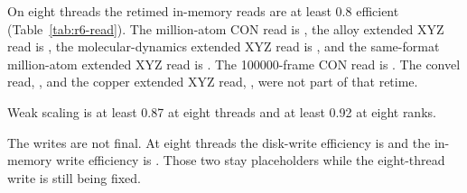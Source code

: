 
On eight threads the retimed in-memory reads are at least 0.8 efficient (Table~\ref{tab:r6-read}).
The million-atom CON read is \effReadConOneE, the alloy extended XYZ read is \effReadAlloy, the molecular-dynamics extended XYZ read is \effReadExtxyzMd, and the same-format million-atom extended XYZ read is \effReadExtxyzSame.
The \num{100000}-frame CON read is \effReadConHundredK.
The convel read, \effReadConvel, and the copper extended XYZ read, \effReadExtxyzCu, were not part of that retime.

Weak scaling is at least 0.87 at eight threads and at least 0.92 at eight ranks.

The writes are not final.
At eight threads the disk-write efficiency is \perfEightDiskWrite and the in-memory write efficiency is \perfEightMemWrite.
Those two stay placeholders while the eight-thread write is still being fixed.

\newcommand{\perfEightDiskWrite}{\textbf{PERF8}}
\newcommand{\perfEightMemWrite}{\textbf{PERF8}}
